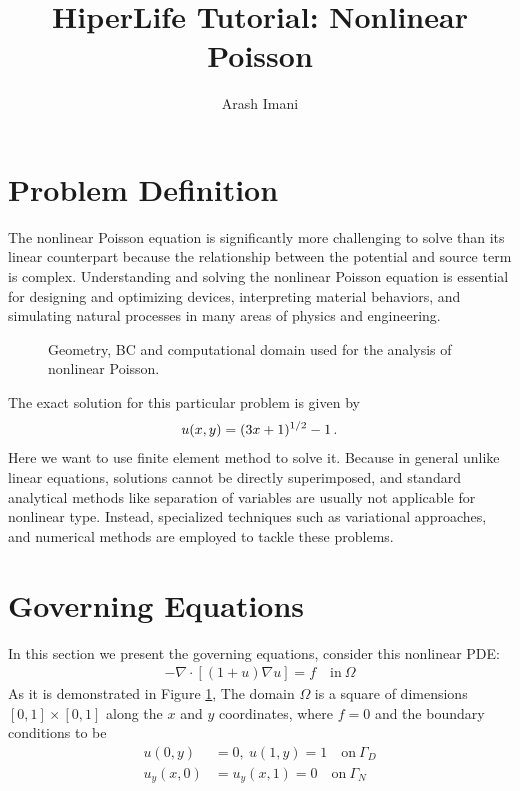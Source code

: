 \documentclass[]{article}
\begin{document}
\title{HiperLife Tutorial: Nonlinear Poisson}
\author{Arash Imani}
\maketitle

\linenumbers

\section{Problem Definition} \label{sec: pd} 
The nonlinear Poisson equation is significantly more challenging to solve than its linear counterpart because the relationship between the potential and source term is complex. Understanding and solving the nonlinear Poisson equation is essential for designing and optimizing devices, interpreting material behaviors, and simulating natural processes in many areas of physics and engineering.
\begin{figure}[htbp]
	\centering
	
	\caption{Geometry, BC and computational domain used for the analysis of nonlinear Poisson.}
	\label{fig_SB}
\end{figure}

The exact solution for this particular problem is given by
\begin{equation}\label{eq3}
	\begin{aligned}
		u(x,y) = (3x +1)^{1/2}-1\thinspace .
	\end{aligned}
\end{equation}
Here we want to use finite element method to solve it. Because in general unlike linear equations, solutions cannot be directly superimposed, and standard analytical methods like separation of variables are usually not applicable for nonlinear type. Instead, specialized techniques such as variational approaches, and numerical methods are employed to tackle these problems.
\section{Governing Equations} \label{sec: ge}
In this section we present the governing equations, consider this nonlinear PDE:\cite{BarattaEtal2023}
\begin{equation}\label{eq1}
	\begin{aligned}
		- \nabla \cdot [(1+u)\nabla u] = f \quad \text{in} \ \Omega
	\end{aligned}
\end{equation}
As it is demonstrated in Figure \ref{fig_SB}, The domain $\Omega$ is a square of dimensions $[0,1] \times [0,1]$ along the $x$ and $y$ coordinates, where $f = 0$ and the boundary conditions to be
\begin{equation}\label{eq2}
	\begin{aligned}
		u(0,y) &= 0, \ u(1,y) = 1\quad \text{on} \ \Gamma_D \\
		u_y(x,0) &=u_y(x,1) =0 \quad \text{on} \ \Gamma_N \\
	\end{aligned}
\end{equation}
\end{document}
